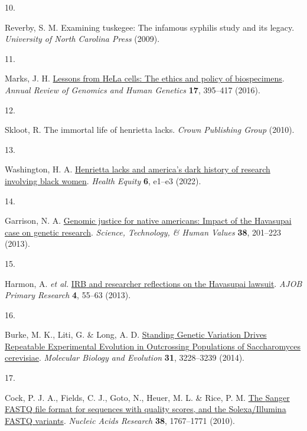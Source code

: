 \documentclass[
  letterpaper,
  DIV=11,
  numbers=noendperiod]{scrreprt}
\newlength{\cslhangindent}
\newlength{\csllabelwidth}
\newenvironment{CSLReferences}[2] %
 {\begin{list}{}{%
  \setlength{\itemindent}{0pt}
  \setlength{\leftmargin}{0pt}
  \setlength{\parsep}{0pt}
  \ifodd #1
   \setlength{\leftmargin}{\cslhangindent}
   \setlength{\itemindent}{-1\cslhangindent}
  \fi
  \setlength{\itemsep}{#2\baselineskip}}}
 {\end{list}}
\newcommand{\CSLLeftMargin}[1]{\parbox[t]{\csllabelwidth}{\strut#1\strut}}
\newcommand{\CSLRightInline}[1]{\parbox[t]{\linewidth - \csllabelwidth}{\strut#1\strut}}
\begin{document}
\begin{CSLReferences}{0}{0}
\CSLLeftMargin{10. }%
\CSLRightInline{Reverby, S. M. Examining tuskegee: The infamous syphilis
study and its legacy. \emph{University of North Carolina Press} (2009).}

\CSLLeftMargin{11. }%
\CSLRightInline{Marks, J. H.
\href{https://doi.org/10.1146/annurev-genom-083115-022536}{Lessons from
{HeLa} cells: The ethics and policy of biospecimens}. \emph{Annual
Review of Genomics and Human Genetics} \textbf{17}, 395--417 (2016).}

\CSLLeftMargin{12. }%
\CSLRightInline{Skloot, R. The immortal life of henrietta lacks.
\emph{Crown Publishing Group} (2010).}

\CSLLeftMargin{13. }%
\CSLRightInline{Washington, H. A.
\href{https://doi.org/10.1089/heq.2021.0151}{Henrietta lacks and
america's dark history of research involving black women}. \emph{Health
Equity} \textbf{6}, e1--e3 (2022).}

\CSLLeftMargin{14. }%
\CSLRightInline{Garrison, N. A.
\href{https://doi.org/10.1177/0162243912470009}{Genomic justice for
native americans: Impact of the {Havasupai} case on genetic research}.
\emph{Science, Technology, \& Human Values} \textbf{38}, 201--223
(2013).}

\CSLLeftMargin{15. }%
\CSLRightInline{Harmon, A. \emph{et al.}
\href{https://doi.org/10.1080/21507716.2013.770104}{{IRB} and researcher
reflections on the {Havasupai} lawsuit}. \emph{AJOB Primary Research}
\textbf{4}, 55--63 (2013).}

\CSLLeftMargin{16. }%
\CSLRightInline{Burke, M. K., Liti, G. \& Long, A. D.
\href{https://doi.org/10.1093/molbev/msu256}{Standing {Genetic}
{Variation} {Drives} {Repeatable} {Experimental} {Evolution} in
{Outcrossing} {Populations} of {Saccharomyces} cerevisiae}.
\emph{Molecular Biology and Evolution} \textbf{31}, 3228--3239 (2014).}

\CSLLeftMargin{17. }%
\CSLRightInline{Cock, P. J. A., Fields, C. J., Goto, N., Heuer, M. L. \&
Rice, P. M. \href{https://doi.org/10.1093/nar/gkp1137}{The {Sanger}
{FASTQ} file format for sequences with quality scores, and the
{Solexa}/{Illumina} {FASTQ} variants}. \emph{Nucleic Acids Research}
\textbf{38}, 1767--1771 (2010).}


\end{CSLReferences}
\end{document}
